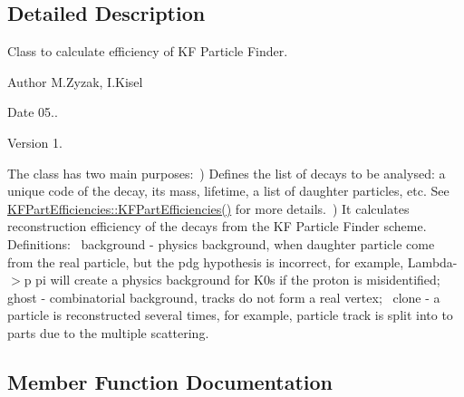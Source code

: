 \subsection{Detailed Description}
Class to calculate efficiency of KF Particle Finder. 

\begin{DoxyAuthor}{Author}
M.\+Zyzak, I.\+Kisel 
\end{DoxyAuthor}
\begin{DoxyDate}{Date}
05.. 
\end{DoxyDate}
\begin{DoxyVersion}{Version}
1.
\end{DoxyVersion}
The class has two main purposes\+:~) Defines the list of decays to be analysed\+: a unique code of the decay, its mass, lifetime, a list of daughter particles, etc. See \hyperlink{classKFPartEfficiencies_a0559adf38115aa40fc8fa96a7d2b2abd}{K\+F\+Part\+Efficiencies\+::\+K\+F\+Part\+Efficiencies()} for more details.~) It calculates reconstruction efficiency of the decays from the KF Particle Finder scheme.~\newline
Definitions\+:~\newline
background -\/ physics background, when daughter particle come from the real particle, but the pdg hypothesis is incorrect, for example, Lambda-\/$>$p pi will create a physics background for K0s if the proton is misidentified;~\newline
ghost -\/ combinatorial background, tracks do not form a real vertex;~\newline
clone -\/ a particle is reconstructed several times, for example, particle track is split into to parts due to the multiple scattering. 

\subsection{Member Function Documentation}
